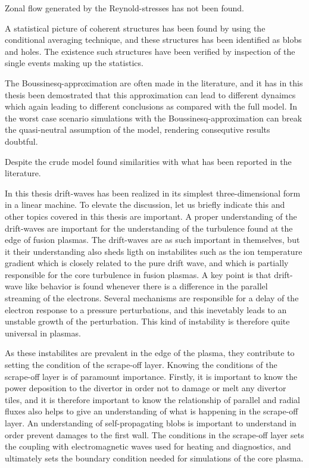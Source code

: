Zonal flow generated by the Reynold-stresses has not been found.


A statistical picture of coherent structures has been found by using the conditional averaging technique, and these structures has been identified as blobs and holes.
The existence such structures have been verified by inspection of the single events making up the statistics.

The Boussinesq-approximation are often made in the literature, and it has in this thesis been demostrated that this approximation can lead to different dynaimcs which again leading to different conclusions as compared with the full model.
In the worst case scenario simulations with the Boussinesq-approximation can break the quasi-neutral assumption of the model, rendering consequtive results doubtful.

Despite the crude model found similarities with what has been reported in the literature.

In this thesis drift-waves has been realized in its simplest three-dimensional form in a linear machine.
To elevate the discussion, let us briefly indicate this and other topics covered in this thesis are important.
A proper understanding of the drift-waves are important for the understanding of the turbulence found at the edge of fusion plasmas.
The drift-waves are as such important in themselves, but it their understanding also sheds ligth on instabilites such as the ion temperature gradient which is closely related to the pure drift wave, and which is partially responsible for the core turbulence in fusion plasmas.
A key point is that drift-wave like behavior is found whenever there is a difference in the parallel streaming of the electrons.
Several mechanisms are responsible for a delay of the electron response to a pressure perturbations, and this inevetably leads to an unstable growth of the perturbation.
This kind of instability is therefore quite universal in plasmas.

As these instabilites are prevalent in the edge of the plasma, they contribute to setting the condition of the scrape-off layer.
Knowing the conditions of the scrape-off layer is of paramount importance.
Firstly, it is important to know the power deposition to the divertor in order not to damage or melt any divertor tiles, and it is therefore important to know the relationship of parallel and radial fluxes also helps to give an understanding of what is happening in the scrape-off layer.
An understanding of self-propagating blobs is important to understand in order prevent damages to the first wall.
The conditions in the scrape-off layer sets the coupling with electromagnetic waves used for heating and diagnostics, and ultimately sets the boundary condition needed for simulations of the core plasma.

